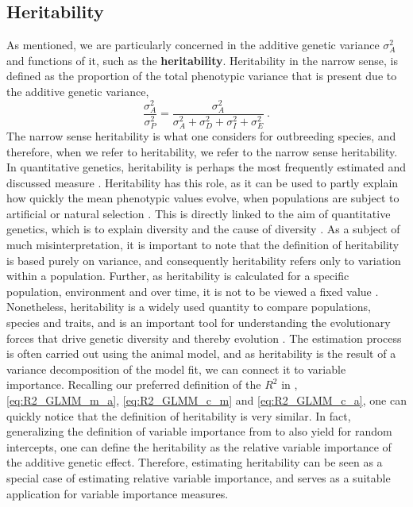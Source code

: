 \subsection*{Heritability}
\label{sec:heritability}
As mentioned, we are particularly concerned in the additive genetic variance $\sigma^2_A$ and functions of it, such as the \textbf{heritability}.
Heritability in the narrow sense, is defined as \citep{Wilson_heritability} the proportion of the total phenotypic variance that is present due to the additive genetic variance, 
\begin{equation}
    \label{eq:h2}
    \frac{\sigma^2_A}{\sigma^2_P} = \frac{\sigma^2_A}{\sigma^2_A + \sigma^2_D + \sigma^2_I + \sigma^2_E} \ .
\end{equation}
The narrow sense heritability is what one considers for outbreeding species, and therefore, when we refer to heritability, we refer to the narrow sense heritability.
In quantitative genetics, heritability is perhaps the most frequently estimated and discussed measure \citep{ConnerHartl2004}. Heritability has this role, as it can be used to partly explain how quickly the mean phenotypic values evolve, when populations are subject to artificial or natural selection \citep{ConnerHartl2004}. This is directly linked to the aim of quantitative genetics, which is to explain diversity and the cause of diversity \citep{Kruuk2004}. As a subject of much misinterpretation, it is important to note that the definition of heritability is based purely on variance, and consequently heritability refers only to variation within a population. Further, as heritability is calculated for a specific population, environment and over time, it is not to be viewed a fixed value \citep{ConnerHartl2004}. Nonetheless, heritability is a widely used quantity to compare populations, species and traits, and is an important tool for understanding the evolutionary forces that drive genetic diversity and thereby evolution \citep{ConnerHartl2004}. The estimation process is often carried out using the animal model, and as heritability is the result of a variance decomposition of the model fit, we can connect it to variable importance.
Recalling our preferred definition of the $R^2$ in , \eqref{eq:R2_GLMM_m_a}, \eqref{eq:R2_GLMM_c_m} and \eqref{eq:R2_GLMM_c_a}, one can quickly notice that the definition of heritability is very similar. In fact, generalizing the definition of variable importance from\citet{gromping_relaimpo} to also yield for random intercepts, one can define the heritability as the relative variable importance of the additive genetic effect. Therefore, estimating heritability can be seen as a special case of estimating relative variable importance, and serves as a suitable application for variable importance measures.
